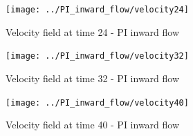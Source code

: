 \begin{figure}[H] 
 \centering 
 \texttt{[image: ../PI\_inward\_flow/velocity24]}
 \caption{Velocity field at time 24 - PI inward flow}
\end{figure}


\begin{figure}[H] 
 \centering 
 \texttt{[image: ../PI\_inward\_flow/velocity32]}
 \caption{Velocity field at time 32 - PI inward flow}
\end{figure}


\begin{figure}[H] 
 \centering 
 \texttt{[image: ../PI\_inward\_flow/velocity40]}
 \caption{Velocity field at time 40 - PI inward flow}
\end{figure}


%
%
%
% 
%
